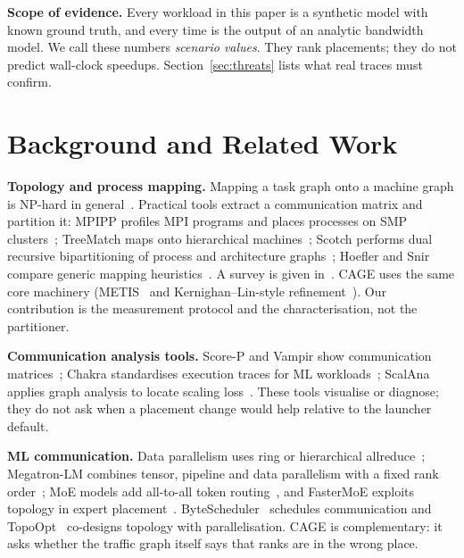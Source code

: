 \documentclass[conference]{IEEEtran}
\begin{document}
\textbf{Scope of evidence.} Every workload in this paper is a synthetic model with known ground
truth, and every time is the output of an analytic bandwidth model. We call these numbers
\emph{scenario values}. They rank placements; they do not predict wall-clock speedups.
Section~\ref{sec:threats} lists what real traces must confirm.

\section{Background and Related Work}\label{sec:related}

\textbf{Topology and process mapping.} Mapping a task graph onto a machine graph is NP-hard in
general~\cite{bokhari1981mapping}. Practical tools extract a communication matrix and partition
it: MPIPP profiles MPI programs and places processes on SMP clusters~\cite{chen2006mpipp};
TreeMatch maps onto hierarchical machines~\cite{jeannot2014treematch}; Scotch performs dual
recursive bipartitioning of process and architecture graphs~\cite{pellegrini1996scotch};
Hoefler and Snir compare generic mapping heuristics~\cite{hoefler2011generic}. A survey is given
in~\cite{hoefler2014overview}. CAGE uses the same core machinery (METIS~\cite{karypis1998metis} and
Kernighan--Lin-style refinement~\cite{kernighan1970}). Our contribution is the measurement
protocol and the characterisation, not the partitioner.

\textbf{Communication analysis tools.} Score-P and Vampir show communication
matrices~\cite{knupfer2012scorep}; Chakra standardises execution traces for ML
workloads~\cite{sridharan2023chakra}; ScalAna applies graph analysis to locate scaling
loss~\cite{jin2020scalana}. These tools visualise or diagnose; they do not ask when a
placement change would help relative to the launcher default.

\textbf{ML communication.} Data parallelism uses ring or hierarchical
allreduce~\cite{sergeev2018horovod,thakur2005mpich,patarasuk2009bandwidth}; Megatron-LM combines
tensor, pipeline and data parallelism with a fixed rank order~\cite{shoeybi2019megatron,
narayanan2021megatron}; MoE models add all-to-all token routing~\cite{lepikhin2021gshard,
fedus2022switch}, and FasterMoE exploits topology in expert placement~\cite{he2022fastermoe}.
ByteScheduler~\cite{peng2019bytescheduler} schedules communication and
TopoOpt~\cite{wang2023topoopt} co-designs topology with parallelisation. CAGE is complementary:
it asks whether the traffic graph itself says that ranks are in the wrong place.
\end{document}
